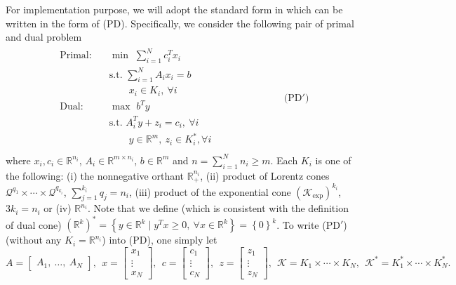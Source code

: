 \documentclass[11pt]{article}
\theoremstyle{definition}
\theoremstyle{plain}
\begin{document}
For implementation purpose, we will adopt the standard form in \cite{SDPT3_2010} which can be written in the form of (PD). Specifically, we consider the following pair of primal and dual problem
\begin{align*}
\begin{split}
\text{Primal:}\quad &\min\,\, \sum_{i=1}^N c_i^Tx_i\\
& \text{s.t.}\,\, \sum_{i=1}^N A_i x_i = b \\
&\quad\quad x_i \in K_i,\ \forall i \\[1ex] 
\text{Dual:} \quad &\max\,\, b^T y\\
& \text{s.t.}\,\, A_i^T y + z_i = c_i, \ \forall i \\
&\quad\quad y \in \mathbb{R}^m,\ z_i \in K_i^*, \forall i \\[1ex]
\end{split} \quad\quad\quad\quad\quad\quad\quad \text{(PD$'$)}
\end{align*}
where $x_i, c_i \in \mathbb{R}^{n_i}$, $A_i \in \mathbb{R}^{m\times n_i}$, $b \in \mathbb{R}^m$ and $n = \sum_{i=1}^N n_i \geq m$. Each $K_i$ is one of the following: (i) the nonnegative orthant $\mathbb{R}_+^{n_i}$, (ii) product of Lorentz cones $\mathcal{Q}^{q_1}\times \cdots \times \mathcal{Q}^{q_{k_i}}$, $\sum_{j=1}^{k_i} q_j = n_i$, (iii) product of the exponential cone  $\left(\mathcal{K}_{\exp}\right)^{k_i}$, $3k_i = n_i$ or (iv) $\mathbb{R}^{n_i}$. Note that we define (which is consistent with the definition of dual cone) $\left(\mathbb{R}^k\right)^* = \left\{ y \in \mathbb{R}^k \mid y^T x \geq 0,\ \forall x \in \mathbb{R}^k  \right\} = \left\{0\right\}^k$. To write (PD$'$) (without any $K_i = \mathbb{R}^{n_i}$) into (PD), one simply let
\[  A = \begin{bmatrix} A_1,\ \hdots,\  A_N \end{bmatrix},\ \
x = \begin{bmatrix} x_1 \\ \vdots\\ x_N \end{bmatrix},\ \ 
c = \begin{bmatrix} c_1 \\ \vdots \\c_N \end{bmatrix},\ \
z = \begin{bmatrix} z_1 \\ \vdots \\ z_N \end{bmatrix},\ \ \mathcal{K} = K_1 \times \cdots \times K_N,\ \ \mathcal{K}^* = K_1^* \times \cdots \times K_N^*.\]
\end{document}
